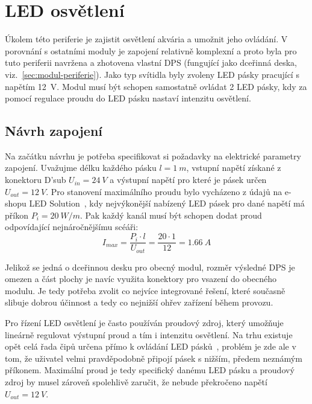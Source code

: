 \section{LED osvětlení}
\label{sec:perif-led-osvetleni}

    Úkolem této periferie je zajistit osvětlení akvária a umožnit jeho ovládání. V porovnání s ostatními moduly je zapojení relativně komplexní a proto byla pro tuto periferii navržena a zhotovena vlastní DPS (fungující jako dceřinná deska, viz.~\ref{sec:modul-periferie}). Jako typ svítidla byly zvoleny LED pásky pracující s napětím \qty{12}{V}. Modul musí být schopen samostatně ovládat 2 LED pásky, kdy za pomocí regulace proudu do LED pásku nastaví intenzitu osvětlení. 

\subsection{Návrh zapojení}
    Na začátku návrhu je potřeba specifikovat si požadavky na elektrické parametry zapojení. Uvažujme délku každého pásku \(l=\qty{1}{m}\), vstupní napětí získané z konektoru D'sub \(U_{in} =\qty{24}{V}\) a výstupní napětí pro které je pásek určen \(U_{out} =\qty{12}{V}\). Pro stanovení maximálního proudu bylo vycházeno z údajů na e-shopu LED Solution~\cite{eshop-ledsolution-svetlo}, kdy nejvýkonější nabízený LED pásek pro dané napětí má příkon \(P_{i}= \qty{20}{W/m}\). Pak každý kanál musí být schopen dodat proud odpovídající nejnáročnějšímu scéáři:
    \begin{equation}  
        I_{max} = \frac{P_{i}\cdot l }{U_{out}} = \frac{20\cdot 1 }{12} = \qty{1.66}{A}
    \end{equation}

    Jelikož se jedná o dceřinnou desku pro obecný modul, rozměr výsledné DPS je omezen a část plochy je navíc využita konektory pro vsazení do obecného modulu. Je tedy potřeba zvolit co nejvíce integrované řešení, které současně slibuje dobrou účinnost a tedy co nejnižší ohřev zařízení během provozu.

    Pro řízení LED osvětlení je často používán proudový zdroj, který umožňuje lineárně regulovat výstupní proud a tím i intenzitu osvětlení. Na trhu existuje opět celá řada čipů určena přímo k ovládání LED pásků~\cite{TODO}, problém je zde ale v tom, že uživatel velmi pravděpodobně připojí pásek s nižším, předem neznámým příkonem. Maximální proud je tedy specifický danému LED pásku a proudový zdroj by musel zároveň spolehlivě zaručit, že nebude překročeno napětí \(U_{out} =\qty{12}{V} \).

